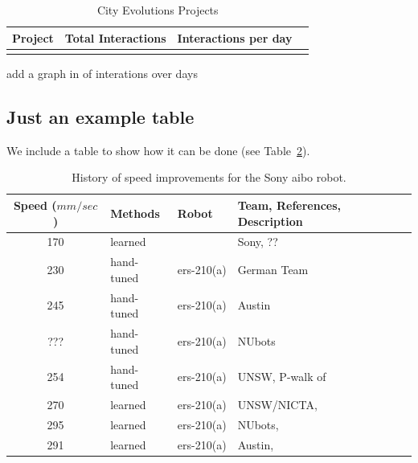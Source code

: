 \documentclass[a4,12pt]{article}
\newenvironment{boxit}{\begin{lrbox}{\savepar}
        \begin{minipage}[b]{4.6in}}
        {\end{minipage}\end{lrbox}\fbox{\usebox{\savepar}}}
\begin{document}
\begin{table}[h!]
    \begin{center}
    \leavevmode
    \begin{tabular}{|cll|l|}\hline
        Project & Total Interactions & Interactions per day\\[0.1cm]\hline
        \\\hline
    \end{tabular}
    \end{center}
    \caption{City Evolutions Projects}
    \label{table:cityEvolutionsProjects}
\end{table}

add a graph in of interations over days
\subsection{Just an example table}
We include a table to show how it can be done (see Table~\ref{table:ListOfVelocities}).
%
\begin{table}[h!]
\begin{center}
\leavevmode
\small %
\begin{tabular}{|cll|l|}\hline
%
Speed (${mm}/{sec}$) & Methods & Robot & Team, References, Description\\[0.1cm]\hline
%
170& learned & & Sony, \citep{HornbyEtAl1999}??\\%
%
230& hand-tuned & {\sc ers}-210(a) & German Team  \\%
%
245& hand-tuned & {\sc ers}-210(a) &Austin  \\%
%
???& hand-tuned & {\sc ers}-210(a) &NUbots  \\%
%
254& hand-tuned & {\sc ers}-210(a) &UNSW, P-walk of \citep{HengstEtAl2001}\\%
%
270& learned & {\sc ers}-210(a) &UNSW/NICTA, \citep{KimUther2003}\\%
%
295& learned & {\sc ers}-210(a) &NUbots,
\citep{QuinlanChalupMiddletonACRA2003}\\%
%
291& learned & {\sc ers}-210(a) &Austin, \citep{KohlStone2004}\\\hline
%
\end{tabular}
\end{center}
\caption{History of speed improvements for the Sony {\sc aibo}
robot.} \label{table:ListOfVelocities}
\end{table}
%
\end{document}
